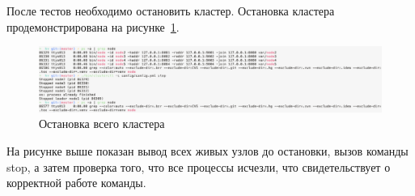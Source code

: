 После тестов необходимо остановить кластер. Остановка кластера продемонстрирована на рисунке~\ref{fig:fig15}.

\begin{figure}
  \centering
  \includegraphics[scale=0.28]{assets/stop.png}
  \caption{Остановка всего кластера}
  \label{fig:fig15}
\end{figure}

На рисунке выше показан вывод всех живых узлов до остановки, вызов команды stop, а затем проверка того, что все процессы исчезли, что свидетельствует о корректной
работе команды.
